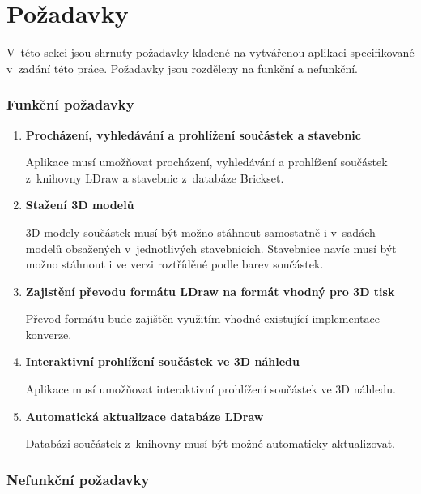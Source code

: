 \chapter{Požadavky}
V~této sekci jsou shrnuty požadavky kladené na vytvářenou aplikaci specifikované v~zadání této práce. Požadavky jsou rozděleny na funkční a nefunkční.

\subsection{Funkční požadavky}

\begin{enumerate}[label=FP-\arabic*]
    \item \label{fp:model:search} \textbf{Procházení, vyhledávání a prohlížení součástek a stavebnic}

    Aplikace musí umožňovat procházení, vyhledávání a prohlížení součástek z~knihovny LDraw a stavebnic z~databáze Brickset. 

    \item \label{fp:model:download} \textbf{Stažení 3D modelů}

    3D modely součástek musí být možno stáhnout samostatně i v~sadách modelů obsažených v~jednotlivých stavebnicích. Stavebnice navíc musí být možno stáhnout i ve verzi roztříděné podle barev součástek.

    \item \label{fp:model:prevod} \textbf{Zajistění převodu formátu LDraw na formát vhodný pro 3D tisk}

    Převod formátu bude zajištěn využitím vhodné existující implementace konverze. 

    \item \label{fp:model:3Dview} \textbf{Interaktivní prohlížení součástek ve 3D náhledu}

    Aplikace musí umožňovat interaktivní prohlížení součástek ve 3D náhledu.

    \item \label{fp:model:update} \textbf{Automatická aktualizace databáze LDraw}

    Databázi součástek z~knihovny musí být možné automaticky aktualizovat.

\end{enumerate}

\subsection{Nefunkční požadavky}

